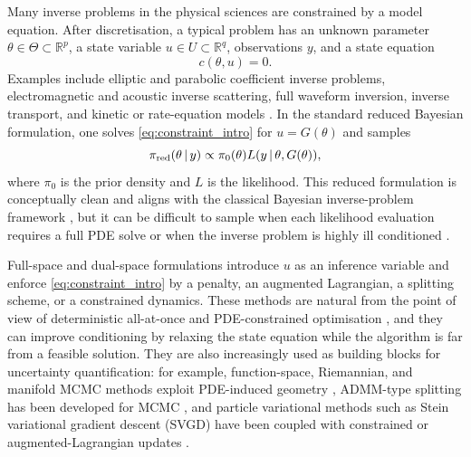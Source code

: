 \documentclass[11pt]{article}
\newcommand{\R}{\mathbb{R}}
\newcommand{\given}{\,|\,}
\begin{document}
Many inverse problems in the physical sciences are constrained by a model equation. After discretisation, a typical problem has an unknown parameter \(\theta\in\Theta\subset\R^p\), a state variable \(u\in U\subset\R^q\), observations \(y\), and a state equation
\begin{equation}
 c(\theta,u)=0. \label{eq:constraint_intro}
\end{equation}
Examples include elliptic and parabolic coefficient inverse problems, electromagnetic and acoustic inverse scattering, full waveform inversion, inverse transport, and kinetic or rate-equation models \cite{Tarantola1984,Tarantola2005,VirieuxOperto2009}. In the standard reduced Bayesian formulation, one solves \eqref{eq:constraint_intro} for \(u=G(\theta)\) and samples
\begin{equation}
 \pi_{\rm red}(\theta\given y)
 \propto
 \pi_0(\theta) L(y\given \theta,G(\theta)), \label{eq:reduced_intro}
\end{equation}
where \(\pi_0\) is the prior density and \(L\) is the likelihood. This reduced formulation is conceptually clean and aligns with the classical Bayesian inverse-problem framework \cite{KaipioSomersalo2005,Stuart2010,CalvettiKaipioSomersalo2014,DashtiStuart2017}, but it can be difficult to sample when each likelihood evaluation requires a full PDE solve or when the inverse problem is highly ill conditioned \cite{BuiThanhGhattasMartinStadler2013, FlathWilcoxAkcelikHillVanBloemenWaandersGhattas2011, MartinWilcoxBursteddeGhattas2012,PetraMartinStadlerGhattas2014, CuiMartinMarzoukSolonenSpantini2014,CuiLawMarzouk2016}.

Full-space and dual-space formulations introduce \(u\) as an inference variable and enforce \eqref{eq:constraint_intro} by a penalty, an augmented Lagrangian, a splitting scheme, or a constrained dynamics. These methods are natural from the point of view of deterministic all-at-once and PDE-constrained optimisation \cite{HaberAscher2001,HinzePinnauUlbrichUlbrich2009,BorziSchulz2012,BenziGolubLiesen2005,vanLeeuwenHerrmann2016}, and they can improve conditioning by relaxing the state equation while the algorithm is far from a feasible solution. They are also increasingly used as building blocks for uncertainty quantification: for example, function-space, Riemannian, and manifold MCMC methods exploit PDE-induced geometry \cite{BuiThanhGirolami2014,CotterRobertsStuartWhite2013, BeskosPinskiSanzSernaStuart2011,HairerStuartVollmer2014,Law2014, BuiThanhNguyen2016,GirolamiCalderhead2011, BeskosGirolamiLanFarrellStuart2017,DiaconisHolmesShahshahani2013, ByrneGirolami2013,ZappaHolmesCerfonGoodman2018, LelievreRoussetStoltz2019,GrahamThieryBeskos2022}, ADMM-type splitting has been developed for MCMC \cite{EcksteinBertsekas1992,BoydParikhChuPeleatoEckstein2011,ParikhBoyd2014,VonoPaulinDoucet2022}, and particle variational methods such as Stein variational gradient descent (SVGD) have been coupled with constrained or augmented-Lagrangian updates \cite{LiuWang2016,JiaLiMeng2022, SiahkoohiAghazadeGholami2026,AghazadeSiahkoohiGholami2026}.
\end{document}
